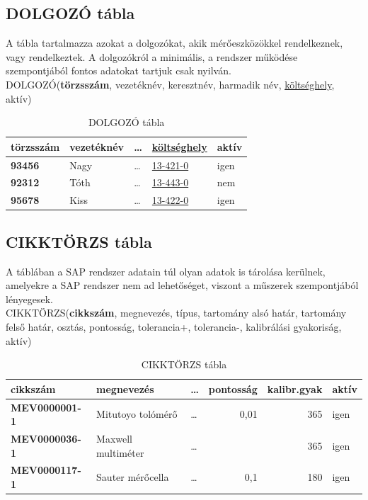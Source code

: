 \documentclass[a4paper,12pt]{report}
\newcommand{\pk}[1]{\textbf{#1}} %
\newcommand{\fk}[1]{\underline{#1}} %
\newcommand{\tabla}[1]{\noindent\MakeUppercase{#1}} %
\begin{document}
\subsection{DOLGOZÓ tábla}
A tábla tartalmazza azokat a dolgozókat, akik mérőeszközökkel 
rendelkeznek, vagy rendelkeztek. A dolgozókról a minimális, a rendszer 
működése szempontjából fontos adatokat tartjuk csak nyilván.\\

\tabla{dolgozó}(\pk{törzsszám}, vezetéknév, keresztnév, harmadik név, 
\fk{költséghely}, aktív)


\begin{table}[ht!]
 \centering
 \begin{footnotesize}
 \begin{tabular}[t]{|l|l|l|l|l|}
  \hline
\textbf{törzsszám}&vezetéknév&\dots&\fk{költséghely}&aktív\\ 
\hline
  \textbf{93456}&Nagy&\dots&\fk{13-421-0}&igen \\
  \textbf{92312}&Tóth&\dots&\fk{13-443-0}&nem \\
  \textbf{95678}&Kiss&\dots&\fk{13-422-0}&igen\\
 \end{tabular}
\end{footnotesize}
\caption{DOLGOZÓ tábla}\label{tabDOLGOZO}
\end{table}


\subsection{CIKKTÖRZS tábla}
A táblában a SAP rendszer adatain túl olyan adatok is tárolása kerülnek, 
amelyekre a SAP rendszer nem ad lehetőséget, viszont a műszerek
szempontjából lényegesek.\\

\tabla{cikktörzs}(\pk{cikkszám}, megnevezés, típus, tartomány alsó határ, tartomány felső határ, osztás, pontosság, tolerancia+, tolerancia-, kalibrálási gyakoriság, aktív)

\begin{table}[ht!]
	\centering
	\begin{footnotesize}
	\begin{tabular}[t]{|l|l|l|r|r|l|}
		\hline
		\textbf{cikkszám}&megnevezés&\dots&pontosság&kalibr.gyak&aktív\\ 
		\hline
		\textbf{MEV0000001-1}&Mitutoyo tolómérő&\dots&0,01&365&igen \\
		\textbf{MEV0000036-1}&Maxwell multiméter&\dots&\,&365&igen \\
		\textbf{MEV0000117-1}&Sauter mérőcella&\dots&0,1&180&igen \\
	\end{tabular}
\end{footnotesize}
	\caption{CIKKTÖRZS tábla}\label{tabCIKKTORZS}
\end{table}
\end{document}
